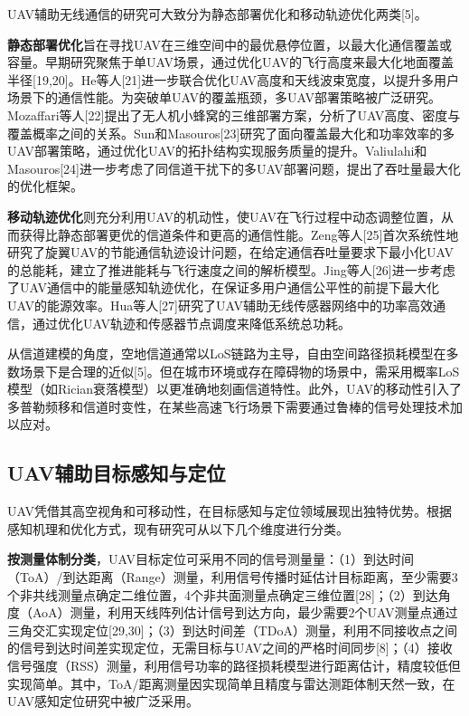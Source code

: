 UAV辅助无线通信的研究可大致分为静态部署优化和移动轨迹优化两类[5]。

\textbf{静态部署优化}旨在寻找UAV在三维空间中的最优悬停位置，以最大化通信覆盖或容量。早期研究聚焦于单UAV场景，通过优化UAV的飞行高度来最大化地面覆盖半径[19,20]。He等人[21]进一步联合优化UAV高度和天线波束宽度，以提升多用户场景下的通信性能。为突破单UAV的覆盖瓶颈，多UAV部署策略被广泛研究。Mozaffari等人[22]提出了无人机小蜂窝的三维部署方案，分析了UAV高度、密度与覆盖概率之间的关系。Sun和Masouros[23]研究了面向覆盖最大化和功率效率的多UAV部署策略，通过优化UAV的拓扑结构实现服务质量的提升。Valiulahi和Masouros[24]进一步考虑了同信道干扰下的多UAV部署问题，提出了吞吐量最大化的优化框架。

\textbf{移动轨迹优化}则充分利用UAV的机动性，使UAV在飞行过程中动态调整位置，从而获得比静态部署更优的信道条件和更高的通信性能。Zeng等人[25]首次系统性地研究了旋翼UAV的节能通信轨迹设计问题，在给定通信吞吐量要求下最小化UAV的总能耗，建立了推进能耗与飞行速度之间的解析模型。Jing等人[26]进一步考虑了UAV通信中的能量感知轨迹优化，在保证多用户通信公平性的前提下最大化UAV的能源效率。Hua等人[27]研究了UAV辅助无线传感器网络中的功率高效通信，通过优化UAV轨迹和传感器节点调度来降低系统总功耗。

从信道建模的角度，空地信道通常以LoS链路为主导，自由空间路径损耗模型在多数场景下是合理的近似[5]。但在城市环境或存在障碍物的场景中，需采用概率LoS模型（如Rician衰落模型）以更准确地刻画信道特性。此外，UAV的移动性引入了多普勒频移和信道时变性，在某些高速飞行场景下需要通过鲁棒的信号处理技术加以应对。

\subsection{UAV辅助目标感知与定位}

UAV凭借其高空视角和可移动性，在目标感知与定位领域展现出独特优势。根据感知机理和优化方式，现有研究可从以下几个维度进行分类。

\textbf{按测量体制分类}，UAV目标定位可采用不同的信号测量量：（1）到达时间（ToA）/到达距离（Range）测量，利用信号传播时延估计目标距离，至少需要3个非共线测量点确定二维位置，4个非共面测量点确定三维位置[28]；（2）到达角度（AoA）测量，利用天线阵列估计信号到达方向，最少需要2个UAV测量点通过三角交汇实现定位[29,30]；（3）到达时间差（TDoA）测量，利用不同接收点之间的信号到达时间差实现定位，无需目标与UAV之间的严格时间同步[8]；（4）接收信号强度（RSS）测量，利用信号功率的路径损耗模型进行距离估计，精度较低但实现简单。其中，ToA/距离测量因实现简单且精度与雷达测距体制天然一致，在UAV感知定位研究中被广泛采用。

